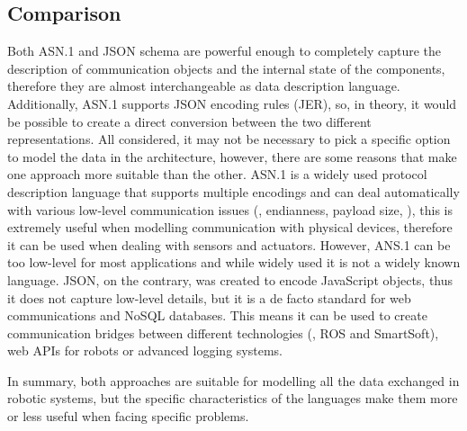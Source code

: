 \subsection{Comparison}
Both ASN.1 and JSON schema are powerful enough to completely capture the description of communication objects and the internal state of the components, therefore they are almost interchangeable as data description language. Additionally, ASN.1 supports JSON encoding rules (JER), so, in theory, it would be possible to create a direct conversion between the two different representations. All considered, it may not be necessary to pick a specific option to model the data in the architecture, however, there are some reasons that make one approach more suitable than the other. ASN.1 is a widely used protocol description language that supports multiple encodings and can deal automatically with various low-level communication issues (\eg, endianness, payload size, \etc), this is extremely useful when modelling communication with physical devices, therefore it can be used when dealing with sensors and actuators. However, ANS.1 can be too low-level for most applications and while widely used it is not a widely known language. JSON, on the contrary, was created to encode JavaScript objects, thus it does not capture low-level details, but it is a de facto standard for web communications and NoSQL databases. This means it can be used to create communication bridges between different technologies (\eg, ROS and SmartSoft), web APIs for robots or advanced logging systems.

In summary, both approaches are suitable for modelling all the data exchanged in robotic systems, but the specific characteristics of the languages make them more or less useful when facing specific problems. 
